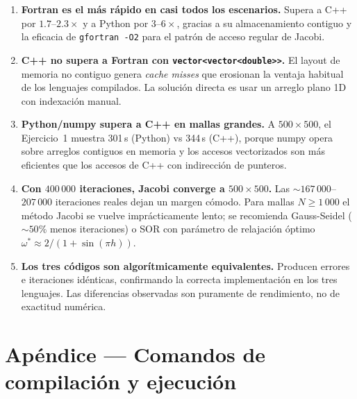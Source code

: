 \documentclass[12pt, a4paper]{article}
\begin{document}
\begin{enumerate}

  \item \textbf{Fortran es el más rápido en casi todos los escenarios.}
        Supera a C++ por $1.7$--$2.3\times$ y a Python por $3$--$6\times$,
        gracias a su almacenamiento contiguo y la eficacia de \texttt{gfortran -O2}
        para el patrón de acceso regular de Jacobi.

  \item \textbf{C++ no supera a Fortran con \texttt{vector<vector<double>>}.}
        El layout de memoria no contiguo genera \emph{cache misses} que erosionan
        la ventaja habitual de los lenguajes compilados. La solución directa es
        usar un arreglo plano 1D con indexación manual.

  \item \textbf{Python/numpy supera a C++ en mallas grandes.}
        A $500\times500$, el Ejercicio~1 muestra 301\,s (Python) vs 344\,s (C++),
        porque numpy opera sobre arreglos contiguos en memoria y los accesos
        vectorizados son más eficientes que los accesos de C++ con
        indirección de punteros.

  \item \textbf{Con $400\,000$ iteraciones, Jacobi converge a $500\times500$.}
        Las $\sim167\,000$--$207\,000$ iteraciones reales dejan un margen
        cómodo. Para mallas $N\geq1\,000$ el método Jacobi se vuelve
        imprácticamente lento; se recomienda Gauss-Seidel ($\sim50\%$
        menos iteraciones) o SOR con parámetro de relajación óptimo
        $\omega^*\approx 2/(1+\sin(\pi h))$.

  \item \textbf{Los tres códigos son algorítmicamente equivalentes.}
        Producen errores e iteraciones idénticas, confirmando la correcta
        implementación en los tres lenguajes. Las diferencias observadas
        son puramente de rendimiento, no de exactitud numérica.

\end{enumerate}

\appendix
\section*{Apéndice — Comandos de compilación y ejecución}
\end{document}
